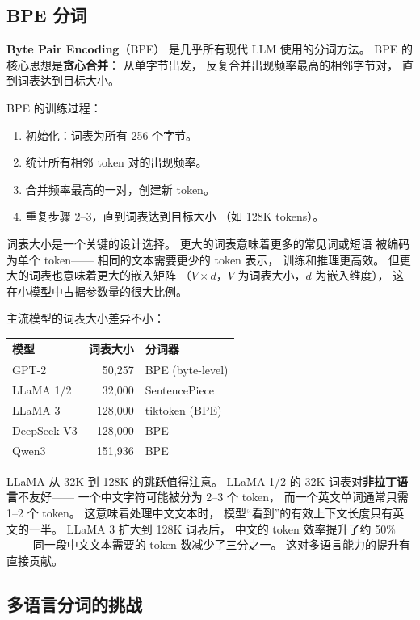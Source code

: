 \subsection{BPE 分词}

\textbf{Byte Pair Encoding}（BPE）
是几乎所有现代 LLM 使用的分词方法。
BPE 的核心思想是\textbf{贪心合并}：
从单字节出发，
反复合并出现频率最高的相邻字节对，
直到词表达到目标大小。

BPE 的训练过程：
\begin{enumerate}[noitemsep]
  \item 初始化：词表为所有 256 个字节。
  \item 统计所有相邻 token 对的出现频率。
  \item 合并频率最高的一对，创建新 token。
  \item 重复步骤 2--3，直到词表达到目标大小
        （如 128K tokens）。
\end{enumerate}

词表大小是一个关键的设计选择。
更大的词表意味着更多的常见词或短语
被编码为单个 token——
相同的文本需要更少的 token 表示，
训练和推理更高效。
但更大的词表也意味着更大的嵌入矩阵
（$V \times d$，$V$ 为词表大小，$d$ 为嵌入维度），
这在小模型中占据参数量的很大比例。

主流模型的词表大小差异不小：

\begin{center}
\small
\begin{tabular}{lrl}
\hline
\textbf{模型} & \textbf{词表大小} & \textbf{分词器} \\
\hline
GPT-2 & 50,257 & BPE (byte-level) \\
LLaMA 1/2 & 32,000 & SentencePiece \\
LLaMA 3 & 128,000 & tiktoken (BPE) \\
DeepSeek-V3 & 128,000 & BPE \\
Qwen3 & 151,936 & BPE \\
\hline
\end{tabular}
\end{center}

LLaMA 从 32K 到 128K 的跳跃值得注意。
LLaMA 1/2 的 32K 词表对\textbf{非拉丁语言}不友好——
一个中文字符可能被分为 2--3 个 token，
而一个英文单词通常只需 1--2 个 token。
这意味着处理中文文本时，
模型``看到''的有效上下文长度只有英文的一半。
LLaMA 3 扩大到 128K 词表后，
中文的 token 效率提升了约 50\%——
同一段中文文本需要的 token 数减少了三分之一。
这对多语言能力的提升有直接贡献。

\subsection{多语言分词的挑战}

